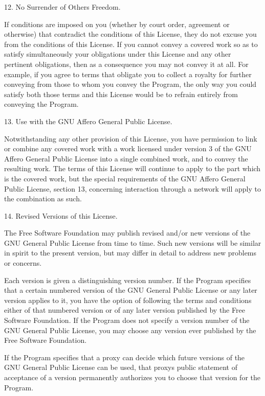 \documentclass[a4paper,10pt,english]{sphinxmanual}
\begin{document}
\begin{sphinxVerbatim}[commandchars=\\\{\}]
  12. No Surrender of Others\PYGZsq{} Freedom.

  If conditions are imposed on you (whether by court order, agreement or
otherwise) that contradict the conditions of this License, they do not
excuse you from the conditions of this License.  If you cannot convey a
covered work so as to satisfy simultaneously your obligations under this
License and any other pertinent obligations, then as a consequence you may
not convey it at all.  For example, if you agree to terms that obligate you
to collect a royalty for further conveying from those to whom you convey
the Program, the only way you could satisfy both those terms and this
License would be to refrain entirely from conveying the Program.

  13. Use with the GNU Affero General Public License.

  Notwithstanding any other provision of this License, you have
permission to link or combine any covered work with a work licensed
under version 3 of the GNU Affero General Public License into a single
combined work, and to convey the resulting work.  The terms of this
License will continue to apply to the part which is the covered work,
but the special requirements of the GNU Affero General Public License,
section 13, concerning interaction through a network will apply to the
combination as such.

  14. Revised Versions of this License.

  The Free Software Foundation may publish revised and/or new versions of
the GNU General Public License from time to time.  Such new versions will
be similar in spirit to the present version, but may differ in detail to
address new problems or concerns.

  Each version is given a distinguishing version number.  If the
Program specifies that a certain numbered version of the GNU General
Public License \PYGZdq{}or any later version\PYGZdq{} applies to it, you have the
option of following the terms and conditions either of that numbered
version or of any later version published by the Free Software
Foundation.  If the Program does not specify a version number of the
GNU General Public License, you may choose any version ever published
by the Free Software Foundation.

  If the Program specifies that a proxy can decide which future
versions of the GNU General Public License can be used, that proxy\PYGZsq{}s
public statement of acceptance of a version permanently authorizes you
to choose that version for the Program.


\end{sphinxVerbatim}
\end{document}
